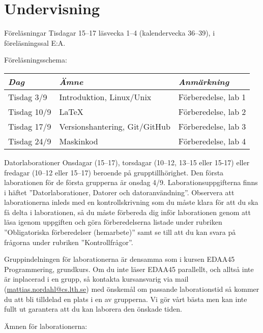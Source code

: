 \documentclass[a4paper]{memoir}
\begin{document}
\clearpage
\section*{Undervisning}

\begin{Items}
    \item[Föreläsningar]
    Tisdagar 15--17 läsvecka 1--4 (kalendervecka 36--39), i föreläsningssal E:A.

    Föreläsningsschema:

    {\hspace{0.5cm}
    \begin{tabular}{lll}
        \emph{Dag}  & \emph{Ämne}                   & \emph{Anmärkning}   \\ \midrule
        Tisdag 3/9  & Introduktion, Linux/Unix      & Förberedelse, lab 1 \\
        Tisdag 10/9 & \LaTeX                        & Förberedelse, lab 2 \\
        Tisdag 17/9 & Versionshantering, Git/GitHub & Förberedelse, lab 3 \\
        Tisdag 24/9 & Maskinkod                     & Förberedelse, lab 4 \\
    \end{tabular}
    }

    \item[Datorlaborationer]
    Onsdagar (15--17), torsdagar (10--12, 13--15 eller 15-17) eller fredagar (10--12 eller 15--17) beroende på grupptillhörighet. Den första laborationen för de första grupperna är onsdag 4/9. Laborationsuppgifterna finns i häftet ''Datorlaborationer, Datorer och datoranvändning''. Observera att laborationerna inleds med en kontrollskrivning som du måste klara för att du ska få delta i laborationen, så du måste förbereda dig inför laborationen genom att läsa igenom uppgiften och göra förberedelserna listade under rubriken ''Obligatoriska förberedelser (hemarbete)'' samt se till att du kan svara på frågorna under rubriken ''Kontrollfrågor''.

    Gruppindelningen för laborationerna är densamma som i kursen EDAA45 Programmering, grundkurs. Om du inte läser EDAA45 parallellt, och alltså inte är inplacerad i en grupp, så kontakta kursansvarig via mail (\url{mattias.nordahl@cs.lth.se}) med önskemål om passande laborationstid så kommer du att bli tilldelad en plats i en av grupperna. Vi gör vårt bästa men kan inte fullt ut garantera att du kan laborera den önskade tiden.

    Ämnen för laborationerna:


\end{Items}
\end{document}
